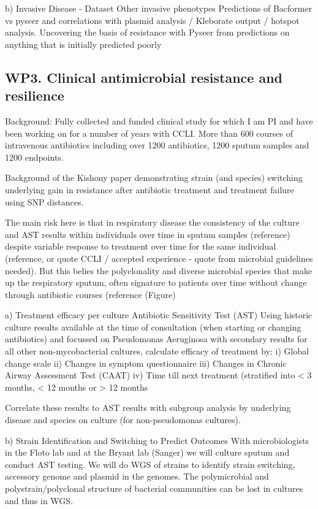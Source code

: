b)  Invasive Disease - 
Dataset 
Other invasive phenotypes
Predictions of Bacformer vs pyseer and correlations with plasmid analysis / Kleborate output / hotspot analysis. 
Uncovering the basis of resistance with Pyseer from predictions on anything that is initially predicted poorly


\subsection*{WP3.  Clinical antimicrobial resistance and resilience}
Background: Fully collected and funded clinical study for which I am PI and have been working on for a number of years with CCLI. More than 600 courses of intravenous antibiotics including over 1200 antibiotics, 1200 sputum samples and 1200 endpoints. 

Background of the Kishony paper demonstrating strain (and species) switching underlying gain in resistance after antibiotic treatment and treatment failure using SNP distances. 

The main risk here is that in respiratory disease the consistency of the culture and AST results within individuals over time in sputum samples (reference) despite variable response to treatment over time for the same individual (reference, or quote CCLI / accepted experience - quote from microbial guidelines needed). But this belies the polyclonality and diverse microbial species that make up the respiratory sputum, often signature to patients over time without change through antibiotic courses (reference (Figure)

a)  Treatment efficacy per culture Antibiotic Sensitivity Test (AST)
Using historic culture results available at the time of consultation (when starting or changing antibiotics) and focussed on Pseudomonas Aeruginosa with secondary results for all other non-mycobacterial cultures, calculate efficacy of treatment by:
i)  Global change scale
ii)  Changes in symptom questionnaire
iii)  Changes in Chronic Airway Assessment Test (CAAT)
iv)  Time till next treatment (stratified into < 3 months, < 12 months or > 12 months

Correlate these results to AST results with subgroup analysis by underlying disease and species on culture (for non-pseudomonas cultures).  

b)  Strain Identification and Switching to Predict Outcomes
With microbiologists in the Floto lab and at the Bryant lab (Sanger) we will culture sputum and conduct AST testing. 
We will do WGS of strains to identify strain switching, accessory genome and plasmid in the genomes. 
The polymicrobial and polystrain/polyclonal structure of bacterial communities can be lost in cultures and thus in WGS.  

